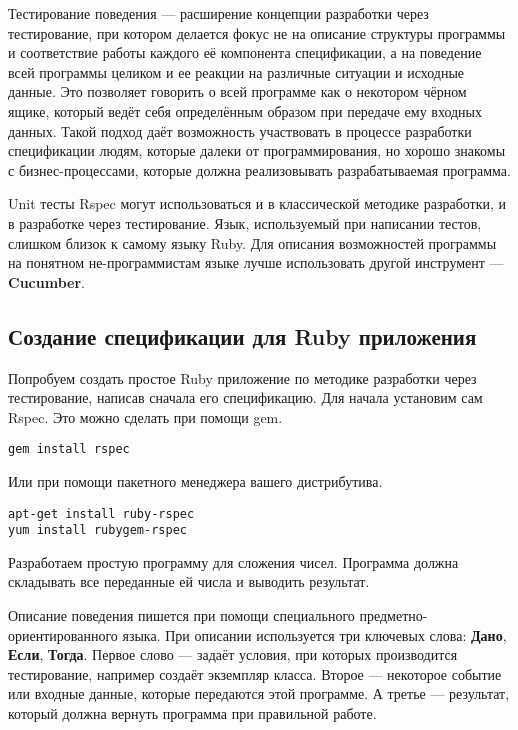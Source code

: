 Тестирование поведения --- расширение концепции разработки через тестирование, при котором делается фокус не на описание структуры программы и соответствие работы каждого её компонента спецификации, а на поведение всей программы целиком и ее реакции на различные ситуации и исходные данные. Это позволяет говорить о всей программе как о некотором чёрном ящике, который ведёт себя определённым образом при передаче ему входных данных. Такой подход даёт возможность участвовать в процессе разработки спецификации людям, которые далеки от программирования, но хорошо знакомы с бизнес-процессами, которые должна реализовывать разрабатываемая программа.

Unit тесты Rspec могут использоваться и в классической методике разработки, и в разработке через тестирование. Язык, используемый при написании тестов, слишком близок к самому языку Ruby. Для описания возможностей программы на понятном не-программистам языке лучше использовать другой инструмент --- \textbf{Cucumber}.

\subsection{Создание спецификации для Ruby приложения}

Попробуем создать простое Ruby приложение по методике разработки через тестирование, написав сначала его спецификацию. Для начала установим сам Rspec. Это можно сделать при помощи gem.

\begin{verbatim}
gem install rspec
\end{verbatim}

Или при помощи пакетного менеджера вашего дистрибутива.

\begin{verbatim}
apt-get install ruby-rspec
yum install rubygem-rspec
\end{verbatim}

Разработаем простую программу для сложения чисел. Программа должна складывать все переданные ей числа и выводить результат.

Описание поведения пишется при помощи специального предметно-ориентированного языка. При описании используется три ключевых слова: \textbf{Дано}, \textbf{Если}, \textbf{Тогда}. Первое слово --- задаёт условия, при которых производится тестирование, например создаёт экземпляр класса. Второе --- некоторое событие или входные данные, которые передаются этой программе. А третье --- результат, который должна вернуть программа при правильной работе.

